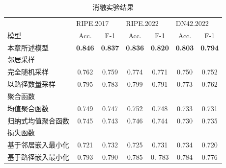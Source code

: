 \begin{table}
    \caption{消融实验结果}
    \begin{tabular}{lcccccc}
        \toprule
                        & \multicolumn{2}{l}{RIPE.2017} & \multicolumn{2}{l}{RIPE.2022} & \multicolumn{2}{l}{DN42.2022}                                                    \\ \cmidrule(lr){2-3} \cmidrule(lr){4-5} \cmidrule(lr){6-7}
        模型              & Acc.                          & F-1                           & Acc.                          & F-1            & Acc.           & F-1            \\ \midrule
        本章所述模型          & \textbf{0.846}                & \textbf{0.837}                & \textbf{0.836}                & \textbf{0.820} & \textbf{0.803} & \textbf{0.794} \\
        \midrule
        邻居采样                                                                                                                                                               \\
        \quad 完全随机采样    & 0.762                         & 0.759                         & 0.774                         & 0.771          & 0.750          & 0.752          \\
        \quad 以路径数量采样   & 0.795                         & 0.783                         & 0.799                         & 0.791          & 0.773          & 0.762          \\
        \midrule
        聚合函数                                                                                                                                                               \\
        \quad 均值聚合函数    & 0.749                         & 0.747                         & 0.752                         & 0.748          & 0.733          & 0.731          \\
        \quad 归纳式均值聚合函数 & 0.745                         & 0.743                         & 0.746                         & 0.744          & 0.730          & 0.735
        \\
        \midrule
        损失函数                                                                                                                                                               \\
        \quad 基于邻居嵌入最小化 & 0.721                         & 0.732                         & 0.725                         & 0.731          & 0.734          & 0.720          \\
        \quad 基于路径嵌入最小化 & 0.793                         & 0.790                         & 0.785                         & 0. 783         & 0.784          & 0.776
        \\
        \bottomrule
    \end{tabular}
    \label{c4_s3tab2}
\end{table}